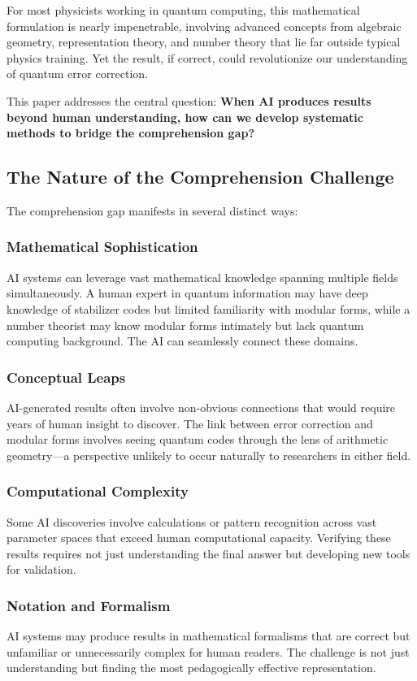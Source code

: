 \documentclass[11pt,a4paper]{article}
\begin{document}
For most physicists working in quantum computing, this mathematical formulation is nearly impenetrable, involving advanced concepts from algebraic geometry, representation theory, and number theory that lie far outside typical physics training. Yet the result, if correct, could revolutionize our understanding of quantum error correction.

This paper addresses the central question: \textbf{When AI produces results beyond human understanding, how can we develop systematic methods to bridge the comprehension gap?}

\subsection{The Nature of the Comprehension Challenge}

The comprehension gap manifests in several distinct ways:

\subsubsection{Mathematical Sophistication}
AI systems can leverage vast mathematical knowledge spanning multiple fields simultaneously. A human expert in quantum information may have deep knowledge of stabilizer codes but limited familiarity with modular forms, while a number theorist may know modular forms intimately but lack quantum computing background. The AI can seamlessly connect these domains.

\subsubsection{Conceptual Leaps}
AI-generated results often involve non-obvious connections that would require years of human insight to discover. The link between error correction and modular forms involves seeing quantum codes through the lens of arithmetic geometry—a perspective unlikely to occur naturally to researchers in either field.

\subsubsection{Computational Complexity}
Some AI discoveries involve calculations or pattern recognition across vast parameter spaces that exceed human computational capacity. Verifying these results requires not just understanding the final answer but developing new tools for validation.

\subsubsection{Notation and Formalism}
AI systems may produce results in mathematical formalisms that are correct but unfamiliar or unnecessarily complex for human readers. The challenge is not just understanding but finding the most pedagogically effective representation.
\end{document}
